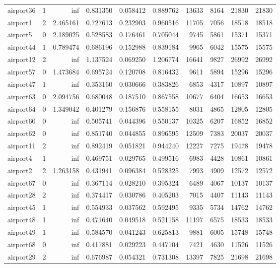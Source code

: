 \begin{longtable}{|l|r|r|r|r|r|r|r|r|r|}
airport36 & 1 & inf & 0.831350 & 0.058412 & 0.889762 & 13633 & 8164 & 21830 & 21830 \\
airport1 & 2 & 2.465161 & 0.727613 & 0.232903 & 0.960516 & 11705 & 7056 & 18518 & 18518 \\
airport5 & 0 & 2.189025 & 0.528583 & 0.176461 & 0.705044 & 9745 & 5861 & 15371 & 15371 \\
airport44 & 1 & 0.789474 & 0.686196 & 0.152988 & 0.839184 & 9965 & 6042 & 15575 & 15575 \\
airport12 & 2 & inf & 1.137524 & 0.069250 & 1.206774 & 16641 & 9827 & 26992 & 26992 \\
airport57 & 0 & 1.473684 & 0.695724 & 0.120708 & 0.816432 & 9611 & 5894 & 15296 & 15296 \\
airport47 & 1 & inf & 0.353160 & 0.030666 & 0.383826 & 6853 & 4317 & 10897 & 10897 \\
airport63 & 0 & 2.094756 & 0.680048 & 0.187510 & 0.867558 & 10677 & 6404 & 16653 & 16653 \\
airport64 & 0 & 1.349042 & 0.401279 & 0.156876 & 0.558155 & 8031 & 4865 & 12805 & 12805 \\
airport60 & 0 & inf & 0.505741 & 0.044396 & 0.550137 & 10325 & 6207 & 16852 & 16852 \\
airport62 & 0 & inf & 0.851740 & 0.044855 & 0.896595 & 12509 & 7383 & 20037 & 20037 \\
airport11 & 2 & inf & 0.892419 & 0.051821 & 0.944240 & 12227 & 7275 & 19478 & 19478 \\
airport4 & 1 & inf & 0.469751 & 0.029765 & 0.499516 & 6983 & 4428 & 10861 & 10861 \\
airport2 & 2 & 1.263158 & 0.431941 & 0.096384 & 0.528325 & 7993 & 4909 & 12572 & 12572 \\
airport67 & 0 & inf & 0.367114 & 0.028210 & 0.395324 & 6489 & 4067 & 10137 & 10137 \\
airport28 & 2 & inf & 0.374417 & 0.030786 & 0.405203 & 7015 & 4407 & 11143 & 11143 \\
airport45 & 1 & inf & 0.554933 & 0.037562 & 0.592495 & 9335 & 5734 & 14762 & 14762 \\
airport48 & 1 & inf & 0.471640 & 0.049518 & 0.521158 & 11197 & 6575 & 18533 & 18533 \\
airport49 & 1 & inf & 0.584570 & 0.041243 & 0.625813 & 9881 & 6005 & 15748 & 15748 \\
airport68 & 0 & inf & 0.417881 & 0.029223 & 0.447104 & 7421 & 4630 & 11526 & 11526 \\
airport29 & 2 & inf & 0.676987 & 0.054321 & 0.731308 & 13397 & 7825 & 21698 & 21698 \\

\end{longtable}
